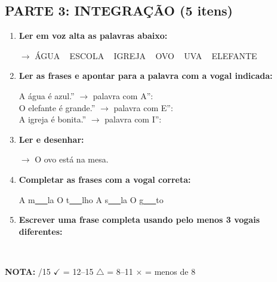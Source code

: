 \begin{exercicio}
\subsection*{PARTE 3: INTEGRAÇÃO (5 itens)}

\begin{enumerate}[resume]
  \item \textbf{Ler em voz alta as palavras abaixo:}
  \begin{center}
  $\rightarrow$ ÁGUA  ~  ESCOLA  ~  IGREJA  ~  OVO  ~  UVA  ~  ELEFANTE
  \end{center}

  \item \textbf{Ler as frases e apontar para a palavra com a vogal indicada:}
  \begin{center}
  A água é azul.'' $\rightarrow$ palavra com A'': \underline{\hspace{3cm}} \\
  O elefante é grande.'' $\rightarrow$ palavra com E'': \underline{\hspace{3cm}} \\
  A igreja é bonita.'' $\rightarrow$ palavra com I'': \underline{\hspace{3cm}}
  \end{center}

  \item \textbf{Ler e desenhar:}
  \begin{center}
  $\rightarrow$ O ovo está na mesa.
  \end{center}
  \begin{center}
  \end{center}

  \item \textbf{Completar as frases com a vogal correta:}
  \begin{center}
  A m\underline{~~~}la \quad O t\underline{~~~}lho \quad A s\underline{~~~}la \quad O g\underline{~~~}to
  \end{center}

  \item \textbf{Escrever uma frase completa usando pelo menos 3 vogais diferentes:}
  \begin{center}
  \underline{\hspace{12cm}} \\
  \underline{\hspace{12cm}}
  \end{center}
\end{enumerate}

\noindent\textbf{NOTA:} \underline{\hspace{1cm}}/15 \quad $\checkmark$ = 12--15 \quad $\triangle$ = 8--11 \quad $\times$ = menos de 8
\end{exercicio}

